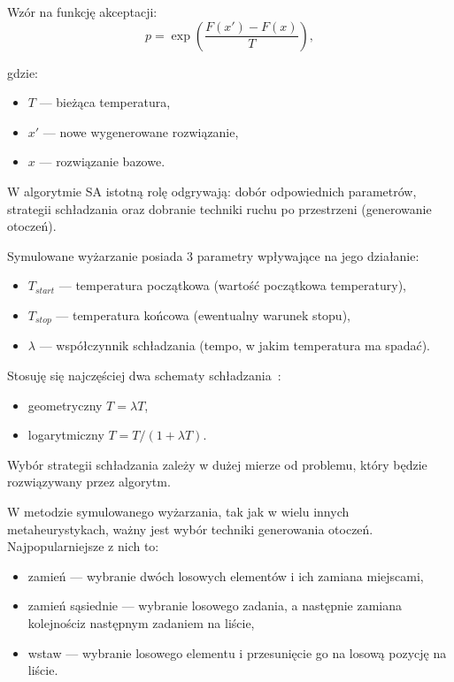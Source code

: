 \newpage
Wzór na funkcję akceptacji:
\begin{equation}
	p=\exp\left(\frac{F(x')-F(x)}{T}\right),
\end{equation}

gdzie:
\begin{itemize}
	\item $T$ --- bieżąca temperatura,
	\item $x'$ --- nowe wygenerowane rozwiązanie,
	\item $x$ --- rozwiązanie bazowe.
\end{itemize}

W algorytmie SA istotną rolę odgrywają: dobór odpowiednich parametrów, strategii schładzania oraz dobranie techniki ruchu po przestrzeni (generowanie otoczeń).

\breakparagraph{}
Symulowane wyżarzanie posiada 3 parametry wpływające na jego działanie:
\begin{itemize}
	\item $T_{start}$ --- temperatura początkowa (wartość początkowa temperatury),
	\item $T_{stop}$ --- temperatura końcowa (ewentualny warunek stopu),
	\item $\lambda$ --- współczynnik schładzania (tempo, w jakim temperatura ma spadać).
\end{itemize}

\breakparagraph{}
Stosuję się najczęściej dwa schematy schładzania~\cite{Smutnicki2002As}:
\begin{itemize}
	\item geometryczny $T = \lambda T$,
	\item logarytmiczny $T = T /(1 + \lambda T)$.
\end{itemize}

\breakparagraph{}
Wybór strategii schładzania zależy w dużej mierze od problemu, który będzie rozwiązywany przez algorytm.

\breakparagraph{}
W metodzie symulowanego wyżarzania, tak jak w wielu innych metaheurystykach, ważny jest wybór techniki generowania otoczeń. Najpopularniejsze z nich to:
\begin{itemize}
	\item zamień --- wybranie dwóch losowych elementów i ich zamiana miejscami,
	\item zamień sąsiednie --- wybranie losowego zadania, a następnie zamiana kolejności\linebreak z następnym zadaniem na liście,
	\item wstaw --- wybranie losowego elementu i przesunięcie go na losową pozycję na liście.
\end{itemize}


